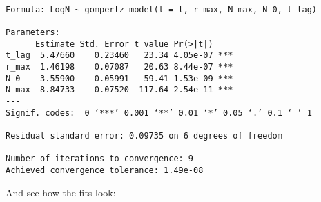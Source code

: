 \documentclass[11pt]{article}
\begin{document}
    
    
    \begin{verbatim}

Formula: LogN ~ gompertz_model(t = t, r_max, N_max, N_0, t_lag)

Parameters:
      Estimate Std. Error t value Pr(>|t|)    
t_lag  5.47660    0.23460   23.34 4.05e-07 ***
r_max  1.46198    0.07087   20.63 8.44e-07 ***
N_0    3.55900    0.05991   59.41 1.53e-09 ***
N_max  8.84733    0.07520  117.64 2.54e-11 ***
---
Signif. codes:  0 ‘***’ 0.001 ‘**’ 0.01 ‘*’ 0.05 ‘.’ 0.1 ‘ ’ 1

Residual standard error: 0.09735 on 6 degrees of freedom

Number of iterations to convergence: 9 
Achieved convergence tolerance: 1.49e-08

    \end{verbatim}

    
    And see how the fits look:
\end{document}
